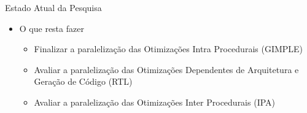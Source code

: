 \begin{frame}{Estado Atual da Pesquisa}
    \begin{itemize}
        \item O que resta fazer
            \begin{itemize}
                \item Finalizar a paralelização das Otimizações Intra Procedurais (GIMPLE)
                \item Avaliar a paralelização das Otimizações Dependentes de Arquitetura e Geração de Código (RTL)
                \item Avaliar a paralelização das Otimizações Inter Procedurais (IPA)
            \end{itemize}
    \end{itemize}
\end{frame}

%
%

